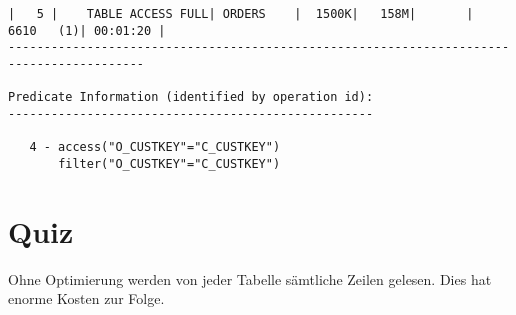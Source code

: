 \documentclass[11pt,a4paper,parskip=half]{scrartcl}
\begin{document}
\begin{lstlisting}
|   5 |    TABLE ACCESS FULL| ORDERS    |  1500K|   158M|       |  6610   (1)| 00:01:20 |                                                                                                                                                                                                                    
-----------------------------------------------------------------------------------------                                                                                                                                                                                                                    
                                                                                                                                                                                                                                                                                                             
Predicate Information (identified by operation id):                                                                                                                                                                                                                                                          
---------------------------------------------------                                                                                                                                                                                                                                                          
                                                                                                                                                                                                                                                                                                             
   4 - access("O_CUSTKEY"="C_CUSTKEY")                                                                                                                                                                                                                                                                       
       filter("O_CUSTKEY"="C_CUSTKEY")                                                                                                                                                                                                                                                                       
\end{lstlisting}

\section{Quiz}
Ohne Optimierung werden von jeder Tabelle sämtliche Zeilen gelesen. Dies hat enorme Kosten zur Folge.
\end{document}
